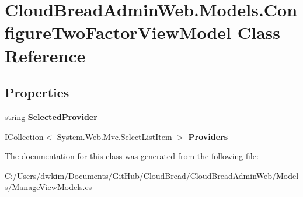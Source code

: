 \hypertarget{a00067}{}\section{Cloud\+Bread\+Admin\+Web.\+Models.\+Configure\+Two\+Factor\+View\+Model Class Reference}
\label{a00067}
\subsection*{Properties}
\begin{DoxyCompactItemize}
\item 
string {\bfseries Selected\+Provider}\hypertarget{a00067_a32ecc646507d84893d1252bc4815ea74}{}\label{a00067_a32ecc646507d84893d1252bc4815ea74}

\item 
I\+Collection$<$ System.\+Web.\+Mvc.\+Select\+List\+Item $>$ {\bfseries Providers}\hypertarget{a00067_a25fb49647e4a89957c7809a4b1d555aa}{}\label{a00067_a25fb49647e4a89957c7809a4b1d555aa}

\end{DoxyCompactItemize}


The documentation for this class was generated from the following file\+:\begin{DoxyCompactItemize}
\item 
C\+:/\+Users/dwkim/\+Documents/\+Git\+Hub/\+Cloud\+Bread/\+Cloud\+Bread\+Admin\+Web/\+Models/Manage\+View\+Models.\+cs\end{DoxyCompactItemize}
